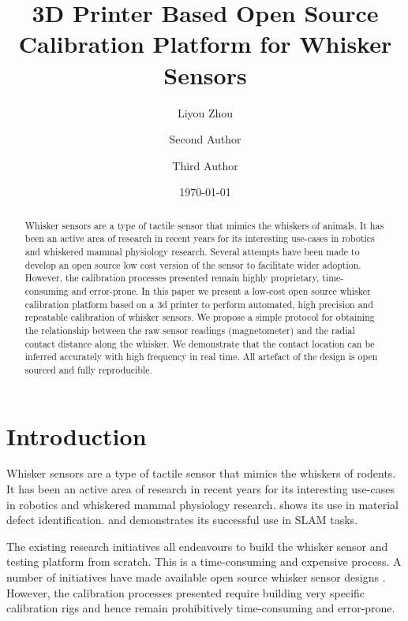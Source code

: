 \documentclass[runningheads]{llncs}
\title{3D Printer Based Open Source Calibration Platform for Whisker Sensors}
\author{Liyou Zhou\inst{1}\orcidID{0009-0005-9491-9003} \and
Second Author\inst{1}\orcidID{1111-2222-3333-4444} \and
Third Author\inst{1}\orcidID{2222--3333-4444-5555}}
\institute{University of Lincoln, Lincoln, UK}
\date{\today}
\begin{document}
\maketitle

\begin{abstract}
Whisker sensors are a type of tactile sensor that mimics the whiskers of animals. It has been an active area of research in recent years for its interesting use-cases in robotics and whiskered mammal physiology research. Several attempts have been made to develop an open source low cost version of the sensor to facilitate wider adoption. However, the calibration processes presented remain highly proprietary, time-consuming and error-prone. In this paper we present a low-cost open source whisker calibration platform based on a 3d printer to perform automated, high precision and repeatable calibration of whisker sensors. We propose a simple protocol for obtaining the relationship between the raw sensor readings (magnetometer) and the radial contact distance along the whisker. We demonstrate that the contact location can be inferred accurately with high frequency in real time. All artefact of the design is open sourced and fully reproducible.
\end{abstract}

\section{Introduction}

Whisker sensors are a type of tactile sensor that mimics the whiskers of rodents. It has been an active area of research in recent years for its interesting use-cases in robotics and whiskered mammal physiology research\cite{prescottActiveTouchSensing2020}. \cite{fotouhiDetectionBarelyVisible2021} shows its use in material defect identification. \cite{struckmeierViTaSLAMBioinspiredVisuoTactile2019} and \cite{foxTactileSLAMBiomimetic2012} demonstrates its successful use in SLAM tasks.

The existing research initiatives all endeavours to build the whisker sensor and testing platform from scratch. This is a time-consuming and expensive process. A number of initiatives have made available open source whisker sensor designs \cite{FoRGroup1OpenWhisker2024} \cite{RatatouilleWhiskersOpenWhiskerOpen}. However, the calibration processes presented require building very specific calibration rigs and hence remain prohibitively time-consuming and error-prone.
\end{document}
